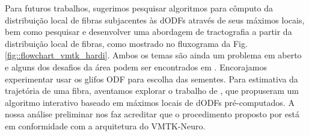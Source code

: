 \documentclass[
    12pt,                %
    oneside,            %
    a4paper,            %
    english,            %
    french,                %
    spanish,            %
    brazil                %
    ]{abntex2}
\begin{document}




Para futuros trabalhos, sugerimos pesquisar algoritmos para cômputo da distribuição local de fibras subjacentes às dODFs através de seus máximos locais, bem como pesquisar e desenvolver uma abordagem de tractografia a partir da distribuição local de fibras, como mostrado no fluxograma da Fig. \ref{fig::flowchart_vmtk_hardi}.
Ambos os temas são ainda um problema em aberto e alguns dos desafios da área podem ser encontrados em .
Encorajamos experimentar usar os glifos ODF para escolha das sementes. 
Para estimativa da trajetória de uma fibra, aventamos explorar o trabalho de , que propuseram um algoritmo interativo baseado em máximos locais de dODFs pré-computados. A nossa análise preliminar nos faz acreditar que o procedimento proposto por  está em conformidade com a arquitetura do VMTK-Neuro.


\end{document}
